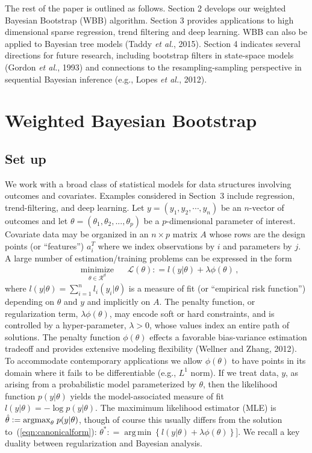 \documentclass[12pt]{TD-CJS}
\newcommand{\R}{\mathcal{R}}
\newcommand{\defeq}{\mathrel{\mathop:}=}
\DeclareMathOperator*{\argmin}{arg\,min}
\begin{document}
The rest of the paper is outlined as follows. Section 2 develops our weighted Bayesian Bootstrap (WBB) algorithm. Section 3 provides applications to high dimensional sparse regression, trend filtering and deep learning. WBB can also be applied to Bayesian tree models (Taddy {\em et al.}, 2015).  Section 4 indicates several directions for future research, 
including bootstrap filters in state-space models (Gordon {\em et al.},  1993)  and connections to the resampling-sampling
perspective in sequential Bayesian inference (e.g., Lopes {\em et al.}, 2012).

\section{Weighted Bayesian Bootstrap}
\subsection{Set up}
We work with a broad class of statistical models for data structures involving outcomes and covariates.
Examples considered in Section~3  include  regression, trend-filtering, and deep learning.
Let  $y=(y_1, y_2, \cdots, y_n)$ be an $n$-vector of outcomes and let $\theta = (\theta_1, \theta_2, ..., \theta_p)$ be a $p$-dimensional parameter of interest. 
Covariate data may be organized in an 
$n \times p$ matrix $A$ whose rows are the design points (or ``features'') $a_i^T$
where we index  observations by $i$ and parameters by $j$.  
A large number of estimation/training  problems can be expressed in the form
\begin{equation}
\label{eqn:canonicalform}
\begin{aligned}
& \underset{\theta \in \R^d}{\text{minimize}}
& &  \mathcal{L}(\theta) \defeq l(y| \theta) + \lambda\phi(\theta) \, ,
\end{aligned}
\end{equation}
where $l(y| \theta) = \sum_{i=1}^n l_i( y_i | \theta )$ is a measure of fit (or ``empirical risk function'') depending on $\theta$ and $y$ and implicitly on $A$.
The penalty function, or regularization term, $\lambda\phi(\theta) $,   
may encode soft or hard constraints, and is controlled by 
a hyper-parameter, $\lambda>0$, whose values index an entire path of solutions. 
The penalty function $\phi(\theta)$ effects a favorable bias-variance 
estimation tradeoff and provides extensive modeling flexibility (Wellner and Zhang, 2012).   
To accommodate contemporary applications we  allow $\phi(\theta)$ to have points in its domain where it fails to be differentiable (e.g., $L^1$ norm).  
If we treat data, $y$, as arising from a probabilistic 
model parameterized by $\theta$, then the likelihood function $p(y|\theta)$ yields 
the model-associated measure of fit $l(y| \theta) = -\log p(y|\theta)$.
The maximimum likelihood estimator (MLE) is  $ \hat{\theta} \defeq {\rm arg max}_\theta\; p(y |\theta) $, though
of course this usually differs from the solution to~(\ref{eqn:canonicalform}): $\theta^* \defeq \argmin \left\{ l(y|\theta) + \lambda \phi(\theta)
 \right\}]$.  We recall a key duality between regularization and Bayesian analysis.
\end{document}
